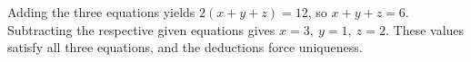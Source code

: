 Adding the three equations yields $2(x+y+z)=12$, so $x+y+z=6$. Subtracting the respective given equations gives $\boxed{x=3,\ y=1,\ z=2}$. These values satisfy all three equations, and the deductions force uniqueness.
